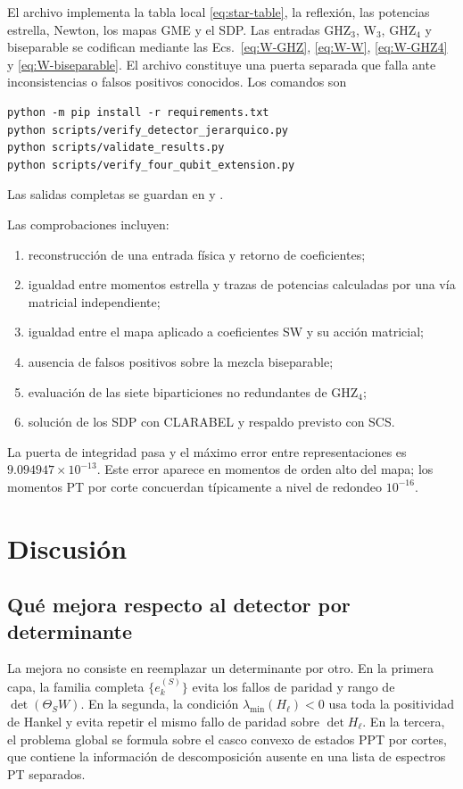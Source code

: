 \documentclass[11pt,a4paper]{article}
\theoremstyle{definition}
\begin{document}
El archivo  implementa la tabla
local \eqref{eq:star-table}, la reflexión, las potencias estrella, Newton, los
mapas GME y el SDP. Las entradas GHZ$_3$, W$_3$, GHZ$_4$ y biseparable se
codifican mediante las Ecs.~\eqref{eq:W-GHZ}, \eqref{eq:W-W},
\eqref{eq:W-GHZ4} y \eqref{eq:W-biseparable}. El archivo
 constituye una puerta separada que falla
ante inconsistencias o falsos positivos conocidos. Los comandos son
{\footnotesize
\begin{verbatim}
python -m pip install -r requirements.txt
python scripts/verify_detector_jerarquico.py
python scripts/validate_results.py
python scripts/verify_four_qubit_extension.py
\end{verbatim}
}
Las salidas completas se guardan en
{\small{}} y
{\small{}}.\par
Las comprobaciones incluyen:
\begin{enumerate}
\item reconstrucción de una entrada física y retorno de coeficientes;
\item igualdad entre momentos estrella y trazas de potencias calculadas por una
vía matricial independiente;
\item igualdad entre el mapa aplicado a coeficientes SW y su acción matricial;
\item ausencia de falsos positivos sobre la mezcla biseparable;
\item evaluación de las siete biparticiones no redundantes de GHZ$_4$;
\item solución de los SDP con CLARABEL y respaldo previsto con SCS.
\end{enumerate}
La puerta de integridad pasa y el máximo error entre representaciones es
$9.094947\times10^{-13}$. Este error aparece en momentos de orden alto del mapa;
los momentos PT por corte concuerdan típicamente a nivel de redondeo
$10^{-16}$.

\section{Discusión}

\subsection{Qué mejora respecto al detector por determinante}

La mejora no consiste en reemplazar un determinante por otro. En la primera
capa, la familia completa $\{e_k^{(S)}\}$ evita los fallos de paridad y rango de
$\det(\Theta_SW)$. En la segunda, la condición
$\lambda_{\min}(H_\ell)<0$ usa toda la positividad de Hankel y evita repetir el
mismo fallo de paridad sobre $\det H_\ell$. En la tercera, el problema global se
formula sobre el casco convexo de estados PPT por cortes, que contiene la
información de descomposición ausente en una lista de espectros PT separados.
\end{document}
